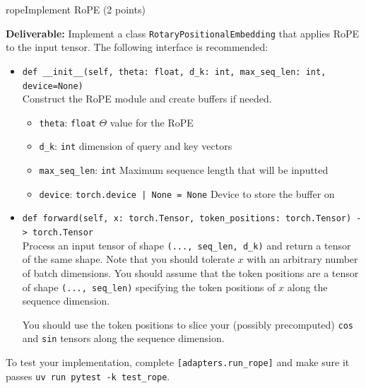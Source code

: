 \begin{problembox}{rope}{Implement RoPE (2 points)}

    \textbf{Deliverable:} Implement a class \texttt{RotaryPositionalEmbedding} that applies RoPE to the input tensor. The following interface is recommended:

    \begin{itemize}[label={}, leftmargin=0pt, itemsep=1em, parsep=0pt]

        \item \texttt{def __init__(self, theta: float, d_k: int, max_seq_len: int, device=None)} \\
              Construct the RoPE module and create buffers if needed.

              \begin{itemize}[label={}, leftmargin=1.5em, itemsep=0.5em, parsep=0pt, topsep=0.5em]
                  \item \texttt{theta}: \textcolor{green!50!black}{\texttt{float}} $\Theta$ value for the RoPE
                  \item \texttt{d\_k}: \textcolor{green!50!black}{\texttt{int}} dimension of query and key vectors
                  \item \texttt{max\_seq\_len}: \textcolor{green!50!black}{\texttt{int}} Maximum sequence length that will be inputted
                  \item \texttt{device}: \textcolor{green!50!black}{\texttt{torch.device | None = None}} Device to store the buffer on
              \end{itemize}

        \item \texttt{def forward(self, x: torch.Tensor, token_positions: torch.Tensor) -> torch.Tensor} \\
              Process an input tensor of shape \texttt{(..., seq\_len, d\_k)} and return a tensor of the same shape. Note that you should tolerate $x$ with an arbitrary number of batch dimensions. You should assume that the token positions are a tensor of shape \texttt{(..., seq\_len)} specifying the token positions of $x$ along the sequence dimension.

              \vspace{0.5em}
              You should use the token positions to slice your (possibly precomputed) \texttt{cos} and \texttt{sin} tensors along the sequence dimension.

    \end{itemize}

    \vspace{0.5em}
    To test your implementation, complete \textcolor{red!80!black}{\texttt{[adapters.run\_rope]}} and make sure it passes \texttt{uv run pytest -k test\_rope}.

\end{problembox}

